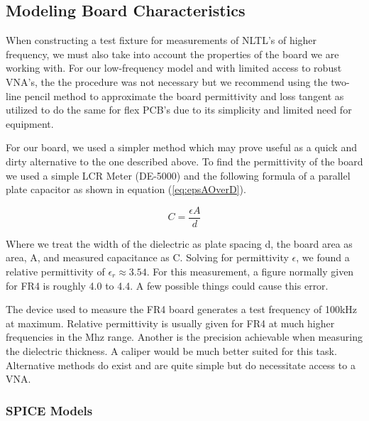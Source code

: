\documentclass[journal]{IEEEtran} \usepackage[english]{babel}
\begin{document}
    
    
   

\subsection{Modeling Board Characteristics}\label{sub:BoardModeling}

When constructing a test fixture for measurements of NLTL's of higher frequency,
we must also take into account the properties of the board we are working with.
For our low-frequency model and with limited access to robust VNA's, the
the procedure was not necessary but we recommend using the two-line pencil
method to approximate the board permittivity and loss tangent as utilized to do
the same for flex PCB's due to its simplicity and limited need for
equipment\cite{TwoLine}.

For our board, we used a simpler method which may prove useful as a quick and
dirty alternative to the one described above. To find the permittivity of the
board we used a simple LCR Meter (DE-5000) and the following formula of a
parallel plate capacitor as shown in equation (\ref{eq:epsAOverD}).



\begin{equation}\label{eq:epsAOverD}
	C =\frac{ \epsilon{}A }{d}
\end{equation}

Where we treat the width of the dielectric as plate spacing d, the board area
as area, A, and measured capacitance as C. Solving for permittivity
$\epsilon$, we found a relative permittivity of $\epsilon_{r}\approx 3.54$.
For this measurement, a figure normally given for FR4 is roughly 4.0 to 4.4. A
few possible things could cause this error. 

The device used to measure the FR4 board generates a test frequency of 100kHz at
maximum. Relative permittivity is usually given for FR4 at much higher
frequencies in the Mhz range. Another is the precision achievable when measuring
the dielectric thickness. A caliper would be much better suited for this task.
Alternative methods do exist and are quite simple but do necessitate access to a
VNA\cite{SimpleRelative}.



    
\subsubsection{SPICE Models}\label{subsub:SPICE}
\end{document}
